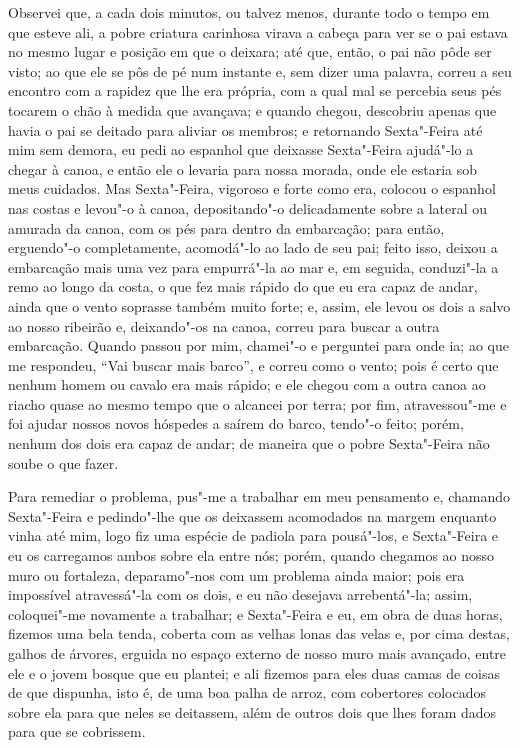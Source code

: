 Observei que, a cada dois minutos, ou talvez menos, durante todo o tempo
em que esteve ali, a pobre criatura carinhosa virava a cabeça para ver
se o pai estava no mesmo lugar e posição em que o deixara; até que,
então, o pai não pôde ser visto; ao que ele se pôs de pé num instante e,
sem dizer uma palavra, correu a seu encontro com a rapidez que lhe era
própria, com a qual mal se percebia seus pés tocarem o chão à medida que
avançava; e quando chegou, descobriu apenas que havia o pai se deitado
para aliviar os membros; e retornando Sexta"-Feira até mim sem demora, eu
pedi ao espanhol que deixasse Sexta"-Feira ajudá"-lo a chegar à canoa, e
então ele o levaria para nossa morada, onde ele estaria sob meus
cuidados. Mas Sexta"-Feira, vigoroso e forte como era, colocou o espanhol
nas costas e levou"-o à canoa, depositando"-o delicadamente sobre a
lateral ou amurada da canoa, com os pés para dentro da embarcação; para
então, erguendo"-o completamente, acomodá"-lo ao lado de seu pai; feito
isso, deixou a embarcação mais uma vez para empurrá"-la ao mar e, em
seguida, conduzi"-la a remo ao longo da costa, o que fez mais rápido do
que eu era capaz de andar, ainda que o vento soprasse também muito
forte; e, assim, ele levou os dois a salvo ao nosso ribeirão e,
deixando"-os na canoa, correu para buscar a outra embarcação. Quando
passou por mim, chamei"-o e perguntei para onde ia; ao que me respondeu,
``Vai buscar mais barco'', e correu como o vento; pois é certo que
nenhum homem ou cavalo era mais rápido; e ele chegou com a outra canoa
ao riacho quase ao mesmo tempo que o alcancei por terra; por fim,
atravessou"-me e foi ajudar nossos novos hóspedes a saírem do barco,
tendo"-o feito; porém, nenhum dos dois era capaz de andar; de maneira que
o pobre Sexta"-Feira não soube o que fazer.

Para remediar o problema, pus"-me a trabalhar em meu pensamento e,
chamando Sexta"-Feira e pedindo"-lhe que os deixassem acomodados na margem
enquanto vinha até mim, logo fiz uma espécie de padiola para pousá"-los,
e Sexta"-Feira e eu os carregamos ambos sobre ela entre nós; porém,
quando chegamos ao nosso muro ou fortaleza, deparamo"-nos com um problema
ainda maior; pois era impossível atravessá"-la com os dois, e eu não
desejava arrebentá"-la; assim, coloquei"-me novamente a trabalhar; e
Sexta"-Feira e eu, em obra de duas horas, fizemos uma bela tenda, coberta
com as velhas lonas das velas e, por cima destas, galhos de árvores,
erguida no espaço externo de nosso muro mais avançado, entre ele e o
jovem bosque que eu plantei; e ali fizemos para eles duas camas de
coisas de que dispunha, isto é, de uma boa palha de arroz, com
cobertores colocados sobre ela para que neles se deitassem, além de
outros dois que lhes foram dados para que se cobrissem.


